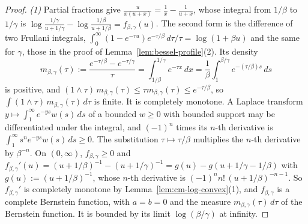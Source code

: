 \begin{proof}
\leanok
{}
\emph{(1)} Partial fractions give $\frac{u}{x(u + x)} = \frac1x - \frac1{u + x}$, whose integral
from $1/\beta$ to $1/\gamma$ is $\log\frac{1/\gamma}{u + 1/\gamma} - \log\frac{1/\beta}{u + 1/\beta}
= f_{\beta,\gamma}(u)$. The second form is the difference of two Frullani integrals,
$\int_0^\infty(1 - e^{-\tau u})e^{-\tau/\beta}\,d\tau/\tau = \log(1 + \beta u)$ and the same for
$\gamma$, those in the proof of Lemma~\ref{lem:bessel-profile}(2). Its density
\[
  m_{\beta,\gamma}(\tau) := \frac{e^{-\tau/\beta} - e^{-\tau/\gamma}}{\tau}
   = \int_{1/\beta}^{1/\gamma}e^{-\tau x}\,dx
   = \frac1\beta\int_1^{\beta/\gamma}e^{-(\tau/\beta)s}\,ds
\]
is positive, and $(1 \wedge \tau)\,m_{\beta,\gamma}(\tau) \le \tau m_{\beta,\gamma}(\tau) \le
e^{-\tau/\beta}$, so $\int(1 \wedge \tau)\,m_{\beta,\gamma}(\tau)\,d\tau$ is finite. It is completely
monotone. A Laplace transform $y \mapsto \int_1^\infty e^{-ys}w(s)\,ds$ of a bounded $w \ge 0$ with
bounded support may be differentiated under the integral, and $(-1)^n$ times its $n$-th derivative is
$\int_1^\infty s^ne^{-ys}w(s)\,ds \ge 0$. The substitution $\tau \mapsto \tau/\beta$
multiplies the $n$-th derivative by $\beta^{-n}$. On $(0, \infty)$, $f_{\beta,\gamma} \ge 0$ and
$f_{\beta,\gamma}'(u) = (u + 1/\beta)^{-1} - (u + 1/\gamma)^{-1} = g(u) - g(u + 1/\gamma - 1/\beta)$
with $g(u) := (u + 1/\beta)^{-1}$, whose $n$-th derivative is $(-1)^nn!\,(u + 1/\beta)^{-n-1}$. So
$f_{\beta,\gamma}'$ is completely monotone by Lemma~\ref{lem:cm-log-convex}(1), and
$f_{\beta,\gamma}$ is a complete Bernstein function, with $a = b = 0$ and the \Levy{} measure
$m_{\beta,\gamma}(\tau)\,d\tau$ of the Bernstein function. It is bounded by its limit
$\log(\beta/\gamma)$ at infinity.


\end{proof}
